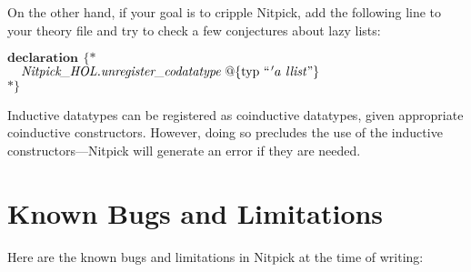 \documentclass[a4paper,12pt]{article}
\renewcommand\_{\hbox{\textunderscore\kern-.05ex}}
\begin{document}
On the other hand, if your goal is to cripple Nitpick, add the following line to
your theory file and try to check a few conjectures about lazy lists:

\prew
$\textbf{declaration}~\,\{{*}$ \\
$\hbox{}\quad\textit{Nitpick\_HOL.unregister\_codatatype}~@\{\antiq{typ}~``\kern1pt'a~\textit{llist\/}\textrm{''}\}$ \\
${*}\}$
\postw

Inductive datatypes can be registered as coinductive datatypes, given
appropriate coinductive constructors. However, doing so precludes
the use of the inductive constructors---Nitpick will generate an error if they
are needed.

\section{Known Bugs and Limitations}
\label{known-bugs-and-limitations}

Here are the known bugs and limitations in Nitpick at the time of writing:
\end{document}
